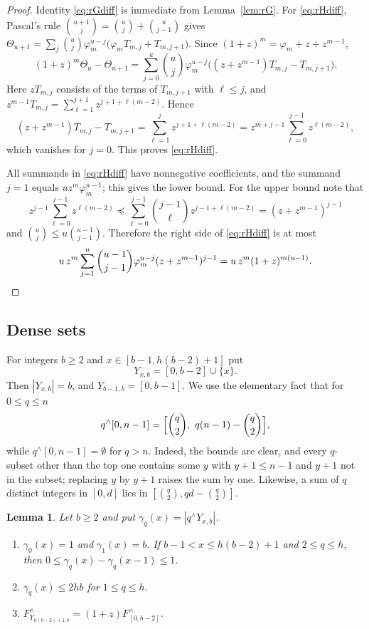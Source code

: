 \documentclass[11pt]{amsart}
\newtheorem{lemma}[theorem]{Lemma}
\theoremstyle{definition}
\theoremstyle{remark}
\numberwithin{equation}{section}
\newcommand{\res}[2]{#1^{\wedge}#2}
\newcommand{\Fr}{F^{\wedge}}
\newcommand{\cle}{\preceq}
\begin{document}
\begin{proof}
Identity \eqref{eq:rGdiff} is immediate from Lemma~\ref{lem:rG}. For \eqref{eq:rHdiff}, Pascal's rule $\binom{u+1}{j}=\binom uj+\binom u{j-1}$ gives $\Theta_{u+1}=\sum_j\binom uj\varphi_m^{u-j}\bigl(\varphi_mT_{m,j}+T_{m,j+1}\bigr)$. Since $(1+z)^m=\varphi_m+z+z^{m-1}$,
\[
(1+z)^m\Theta_u-\Theta_{u+1}=\sum_{j=0}^u\binom uj\varphi_m^{u-j}\bigl((z+z^{m-1})T_{m,j}-T_{m,j+1}\bigr).
\]
Here $zT_{m,j}$ consists of the terms of $T_{m,j+1}$ with $\ell\le j$, and $z^{m-1}T_{m,j}=\sum_{\ell=1}^{j+1}z^{j+1+\ell(m-2)}$. Hence
\[
(z+z^{m-1})T_{m,j}-T_{m,j+1}=\sum_{\ell=1}^jz^{j+1+\ell(m-2)}=z^{m+j-1}\sum_{\ell=0}^{j-1}z^{\ell(m-2)},
\]
which vanishes for $j=0$. This proves \eqref{eq:rHdiff}.

All summands in \eqref{eq:rHdiff} have nonnegative coefficients, and the summand $j=1$ equals $uz^m\varphi_m^{u-1}$; this gives the lower bound. For the upper bound note that
\[
z^{j-1}\sum_{\ell=0}^{j-1}z^{\ell(m-2)}\cle\sum_{\ell=0}^{j-1}\binom{j-1}{\ell}z^{j-1+\ell(m-2)}=(z+z^{m-1})^{j-1}
\]
and $\binom uj\le u\binom{u-1}{j-1}$. Therefore the right side of \eqref{eq:rHdiff} is at most
\[
u\,z^m\sum_{j=1}^u\binom{u-1}{j-1}\varphi_m^{u-j}(z+z^{m-1})^{j-1}=u\,z^m(1+z)^{m(u-1)}.\qedhere
\]
\end{proof}

\subsection{Dense sets}
For integers $b\ge 2$ and $x\in[b-1,h(b-2)+1]$ put
\[
Y_{x,b}=[0,b-2]\cup\{x\}.
\]
Then $|Y_{x,b}|=b$, and $Y_{b-1,b}=[0,b-1]$. We use the elementary fact that for $0\le q\le n$
\begin{equation}\label{eq:interval-restricted}
\res q[0,n-1]=\Bigl[\binom q2,\ q(n-1)-\binom q2\Bigr],
\end{equation}
while $\res q[0,n-1]=\emptyset$ for $q>n$. Indeed, the bounds are clear, and every $q$-subset other than the top one contains some $y$ with $y+1\le n-1$ and $y+1$ not in the subset; replacing $y$ by $y+1$ raises the sum by one. Likewise, a sum of $q$ distinct integers in $[0,d]$ lies in $[\binom q2,qd-\binom q2]$.

\begin{lemma}\label{lem:rdense}
Let $b\ge 2$ and put $\gamma_q(x)=|\res qY_{x,b}|$.
\begin{enumerate}[label=\textup{(\alph*)}]
\item $\gamma_0(x)=1$ and $\gamma_1(x)=b$. If $b-1<x\le h(b-2)+1$ and $2\le q\le h$, then $0\le\gamma_q(x)-\gamma_q(x-1)\le 1$.
\item $\gamma_q(x)\le 2hb$ for $1\le q\le h$.
\item $\Fr_{Y_{h(b-2)+1,b}}=(1+z)\Fr_{[0,b-2]}$.
\end{enumerate}
\end{lemma}
\end{document}
